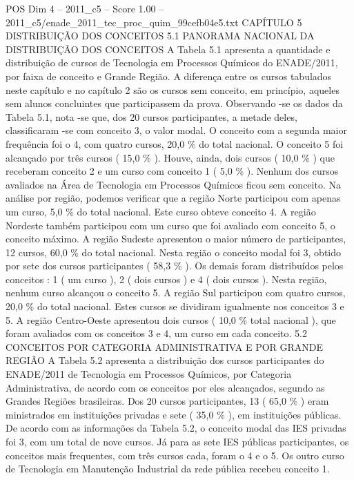 \begin{textsample}{POS Dim 4 – 2011\_c5 – Score 1.00 – 2011\_c5/enade\_2011\_tec\_proc\_quim\_99cefb04e5.txt}  \label{ex:f4_pos_239}
CAPÍTULO 5 DISTRIBUIÇÃO DOS CONCEITOS 5.1 PANORAMA NACIONAL DA DISTRIBUIÇÃO DOS CONCEITOS A Tabela 5.1 apresenta a quantidade e distribuição de cursos de Tecnologia em Processos Químicos do ENADE/2011, por faixa de conceito e Grande Região.
A diferença entre os cursos tabulados neste capítulo e no capítulo 2 são os cursos sem conceito, em princípio, aqueles sem alunos concluintes que participassem da prova.
Observando -se os dados da Tabela 5.1, nota -se que, dos 20 cursos participantes, a metade deles, classificaram -se com conceito 3, o valor modal.
O conceito com a segunda maior frequência foi o 4, com quatro cursos, 20,0 \% do total nacional.
O conceito 5 foi alcançado por três cursos ( 15,0 \% ).
Houve, ainda, dois cursos ( 10,0 \% ) que receberam conceito 2 e um curso com conceito 1 ( 5,0 \% ).
Nenhum dos cursos avaliados na Área de Tecnologia em Processos Químicos ficou sem conceito.
Na análise por região, podemos verificar que a região Norte participou com apenas um curso, 5,0 \% do total nacional.
Este curso obteve conceito 4.
A região Nordeste também participou com um curso que foi avaliado com conceito 5, o conceito máximo.
A região Sudeste apresentou o maior número de participantes, 12 cursos, 60,0 \% do total nacional.
Nesta região o conceito modal foi 3, obtido por sete dos cursos participantes ( 58,3 \% ).
Os demais foram distribuídos pelos conceitos : 1 ( um curso ), 2 ( dois cursos ) e 4 ( dois cursos ).
Nesta região, nenhum curso alcançou o conceito 5.
A região Sul participou com quatro cursos, 20,0 \% do total nacional.
Estes cursos se dividiram igualmente nos conceitos 3 e 5.
A região Centro-Oeste apresentou dois cursos ( 10,0 \% total nacional ), que foram avaliados com os conceitos 3 e 4, um curso em cada conceito. 5.2 CONCEITOS POR CATEGORIA ADMINISTRATIVA E POR GRANDE REGIÃO A Tabela 5.2 apresenta a distribuição dos cursos participantes do ENADE/2011 de Tecnologia em Processos Químicos, por Categoria Administrativa, de acordo com os conceitos por eles alcançados, segundo as Grandes Regiões brasileiras.
Dos 20 cursos participantes, 13 ( 65,0 \% ) eram ministrados em instituições privadas e sete ( 35,0 \% ), em instituições públicas.
De acordo com as informações da Tabela 5.2, o conceito modal das IES privadas foi 3, com um total de nove cursos.
Já para as sete IES públicas participantes, os conceitos mais frequentes, com três cursos cada, foram o 4 e o 5.
Os outro curso de Tecnologia em Manutenção Industrial da rede pública recebeu conceito 1.

\end{textsample}
